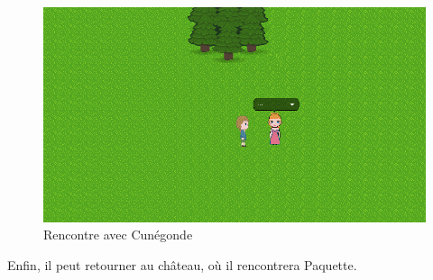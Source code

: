 \documentclass[11pt]{article}
\begin{document}
\begin{figure}[H]
\includegraphics[scale=0.30]{gameplay8}
\centering
\caption{Rencontre avec Cunégonde}
\end{figure}

Enfin, il peut retourner au château, où il rencontrera Paquette.
\end{document}
